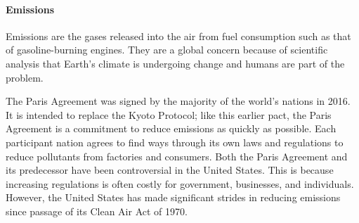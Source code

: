 \paragraph{Emissions} Emissions are the gases released into the air from fuel
consumption such as that of gasoline-burning engines. They are a global concern
because of scientific analysis that Earth's climate is undergoing change and
humans are part of the problem.

The Paris Agreement was signed by the majority of the world’s nations in 2016.
It is intended to replace the Kyoto Protocol; like this earlier pact, the Paris
Agreement is a commitment to reduce emissions as quickly as possible. Each
participant nation agrees to find ways through its own laws and regulations to
reduce pollutants from factories and consumers. Both the Paris Agreement and its
predecessor have been controversial in the United States. This is because
increasing regulations is often costly for government, businesses, and
individuals. However, the United States has made significant strides in reducing
emissions since passage of its Clean Air Act of 1970.

\newpage

